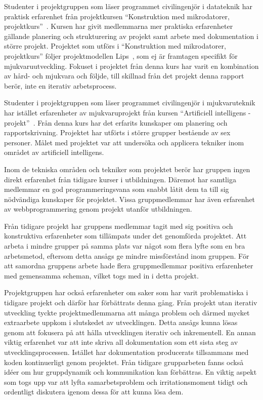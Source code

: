 Studenter i projektgruppen som läser programmet civilingenjör i datateknik har praktisk erfarenhet från projektkursen ``Konstruktion med mikrodatorer, projektkurs''~\cite{tsea29}. Kursen har givit medlemmarna mer praktiska erfarenheter gällande planering och strukturering av projekt samt arbete med dokumentation i större projekt. Projektet som utförs i ``Konstruktion med mikrodatorer, projektkurs'' följer projektmodellen Lips~\cite{lips}, som ej är framtagen specifikt för mjukvaruutveckling. Fokuset i projektet från denna kurs har varit en kombination av hård- och mjukvara och följde, till skillnad från det projekt denna rapport berör, inte en iterativ arbetsprocess.

Studenter i projektgruppen som läser programmet civilingenjör i mjukvaruteknik har istället erfarenheter av mjukvaruprojekt från kursen ``Artificiell intelligens - projekt''~\cite{tddd92}. Från denna kurs har det erfarits kunskaper om planering och rapportskrivning. Projektet har utförts i större grupper bestående av sex personer. Målet med projektet var att undersöka och applicera tekniker inom området av artificiell intelligens. 

Inom de tekniska områden och tekniker som projektet berör har gruppen ingen direkt erfarenhet från tidigare kurser i utbildningen. Däremot har samtliga medlemmar en god programmeringsvana som snabbt låtit dem ta till sig nödvändiga kunskaper för projektet. Vissa gruppmedlemmar har även erfarenhet av webbprogrammering genom projekt utanför utbildningen.

Från tidigare projekt har gruppens medlemmar tagit med sig positiva och konstruktiva erfarenheter som tillämpats under det genomförda projektet. Att arbeta i mindre grupper på samma plats var något som flera lyfte som en bra arbetsmetod, eftersom detta ansågs ge mindre missförstånd inom gruppen. För att samordna gruppens arbete hade flera gruppmedlemmar positiva erfarenheter med gemensamma scheman, vilket togs med in i detta projekt.

Projektgruppen har också erfarenheter om saker som har varit problematiska i tidigare projekt och därför har förbättrats denna gång. Från projekt utan iterativ utveckling tyckte projektmedlemmarna att många problem och därmed mycket extraarbete uppkom i slutskedet av utvecklingen. Detta ansågs kunna lösas genom att fokusera på att hålla utvecklingen iterativ och inkrementell. En annan viktig erfarenhet var att inte skriva all dokumentation som ett sista steg av utvecklingsprocessen. Istället har dokumentation producerats tillsammans med koden kontinuerligt genom projektet. Från tidigare grupparbeten fanns också idéer om hur gruppdynamik och kommunikation kan förbättras. En viktig aspekt som togs upp var att lyfta samarbetsproblem och irritationsmoment tidigt och ordentligt diskutera igenom dessa för att kunna lösa dem.
